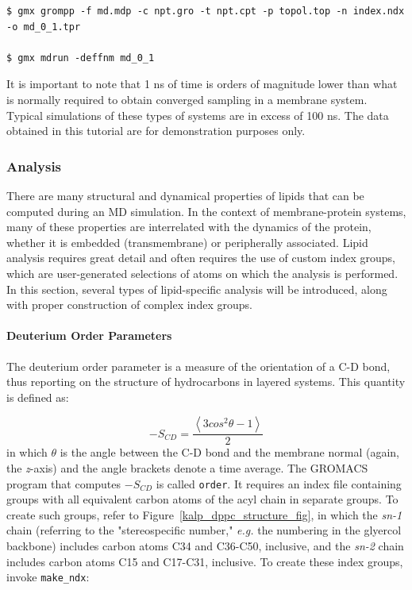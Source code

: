\documentclass[9pt,tutorial,pubversion]{livecoms}
\begin{document}
\begin{lstlisting}
$ gmx grompp -f md.mdp -c npt.gro -t npt.cpt -p topol.top -n index.ndx -o md_0_1.tpr

$ gmx mdrun -deffnm md_0_1
\end{lstlisting}
%
It is important to note that 1 ns of time is orders of magnitude lower than what is normally required to obtain converged sampling in a membrane system. Typical simulations of these types of systems are in excess of 100 ns. The data obtained in this tutorial are for demonstration purposes only.

\subsubsection{Analysis} \label{kalp_ana}

There are many structural and dynamical properties of lipids that can be computed during an MD simulation. In the context of membrane-protein systems, many of these properties are interrelated with the dynamics of the protein, whether it is embedded (transmembrane) or peripherally associated. Lipid analysis requires great detail and often requires the use of custom index groups, which are user-generated selections of atoms on which the analysis is performed. In this section, several types of lipid-specific analysis will be introduced, along with proper construction of complex index groups.

\paragraph{Deuterium Order Parameters} \label{kalp_ana_scd}

The deuterium order parameter is a measure of the orientation of a C-D bond, thus reporting on the structure of hydrocarbons in layered systems. This quantity is defined as:

\begin{equation} \label{eq_scd}
-S_{CD} = \frac{\left\langle 3 cos^2 \theta - 1\right\rangle}{2}
\end{equation}
%
in which $\theta$ is the angle between the C-D bond and the membrane normal (again, the {\em z}-axis) and the angle brackets denote a time average. The GROMACS program that computes $-S_{CD}$ is called \texttt{order}. It requires an index file containing groups with all equivalent carbon atoms of the acyl chain in separate groups. To create such groups, refer to Figure~\ref{kalp_dppc_structure_fig}, in which the {\em sn-1} chain (referring to the "stereospecific number," {\em e.g.} the numbering in the glyercol backbone) includes carbon atoms C34 and C36-C50, inclusive, and the {\em sn-2} chain includes carbon atoms C15 and C17-C31, inclusive. To create these index groups, invoke \texttt{make\_ndx}:
\end{document}
